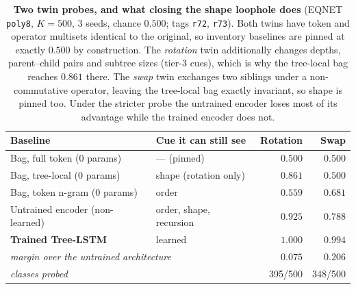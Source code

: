\begin{table}[H]
\centering
\caption{\textbf{Two twin probes, and what closing the shape loophole does} (EQNET \texttt{poly8},
$K{=}500$, 3 seeds, chance $0.500$; tags \texttt{r72}, \texttt{r73}). Both twins have token and
operator multisets identical to the original, so inventory baselines are pinned at exactly $0.500$
by construction. The \emph{rotation} twin additionally changes depths, parent--child pairs and
subtree sizes (tier-3 cues), which is why the tree-local bag reaches $0.861$ there. The
\emph{swap} twin exchanges two siblings under a non-commutative operator, leaving the tree-local bag
exactly invariant, so shape is pinned too. Under the stricter probe the untrained encoder loses most
of its advantage while the trained encoder does not.}
\label{tab:twin}
\small
\begin{tabular}{l l rr}
\toprule
Baseline & Cue it can still see & Rotation & \textbf{Swap} \\
\midrule
Bag, full token (0 params)      & --- (pinned)            & $0.500$ & $0.500$ \\
Bag, tree-local (0 params)      & shape (rotation only)   & $0.861$ & $0.500$ \\
Bag, token n-gram (0 params)    & order                   & $0.559$ & $0.681$ \\
Untrained encoder (non-learned) & order, shape, recursion & $0.925$ & $0.788$ \\
\midrule
\textbf{Trained Tree-LSTM}      & learned                 & $\mathbf{1.000}$ & $\mathbf{0.994}$ \\
\midrule
\multicolumn{2}{l}{\emph{margin over the untrained architecture}} & $0.075$ & $\mathbf{0.206}$ \\
\multicolumn{2}{l}{\emph{classes probed}} & 395/500 & 348/500 \\
\bottomrule
\end{tabular}
\end{table}
